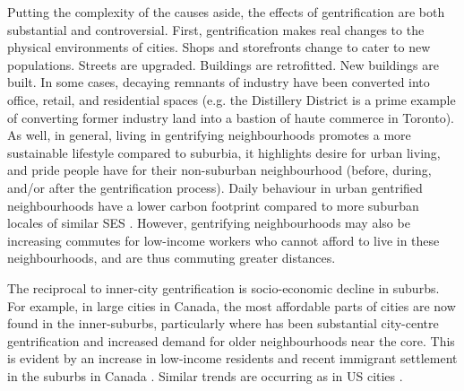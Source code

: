 Putting the complexity of the causes aside, the effects of gentrification are both substantial and controversial. First, gentrification makes real changes to the physical environments of cities. Shops and storefronts change to cater to new populations. Streets are upgraded. Buildings are retrofitted. New buildings are built. In some cases, decaying remnants of industry have been converted into office, retail, and residential spaces (e.g. the Distillery District is a prime example of converting former industry land into a bastion of haute commerce in Toronto). As well, in general, living in gentrifying neighbourhoods promotes a more sustainable lifestyle compared to suburbia, it highlights desire for urban living, and pride people have for their non-suburban neighbourhood (before, during, and/or after the gentrification process). Daily behaviour in urban gentrified neighbourhoods have a lower carbon footprint compared to more suburban locales of similar SES \cite{ewing_compactness_2015}. However, gentrifying neighbourhoods may also be increasing commutes for low-income workers who cannot afford to live in these neighbourhoods, and are thus commuting greater distances.

The reciprocal to inner-city gentrification is socio-economic decline in suburbs. For example, in large cities in Canada, the most affordable parts of cities are now found in the inner-suburbs, particularly where has been substantial city-centre gentrification and increased demand for older neighbourhoods near the core. This is evident by an increase in low-income residents and recent immigrant settlement in the suburbs in Canada \cite{bourne_changing_2001,ades_are_2012}. Similar trends are occurring as in US cities \cite{ehrenhalt_great_2012,delmelle_differentiating_2017}.

